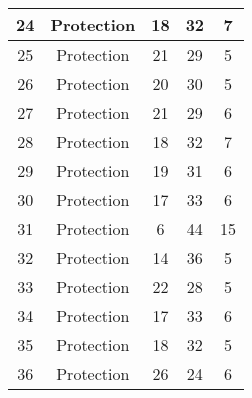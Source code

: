 \documentclass[results.tex]{subfiles}
\begin{document}
\begin{center}
\begin{tabular}{| c || c | c | c | c |}
            \hline
            24                      & Protection                   & 18                     & 32                      & 7                    \\
            \hline
            25                      & Protection                   & 21                     & 29                      & 5                    \\
            \hline
            26                      & Protection                   & 20                     & 30                      & 5                    \\
            \hline
            27                      & Protection                   & 21                     & 29                      & 6                    \\
            \hline
            28                      & Protection                   & 18                     & 32                      & 7                    \\
            \hline
            29                      & Protection                   & 19                     & 31                      & 6                    \\
            \hline
            30                      & Protection                   & 17                     & 33                      & 6                    \\
            \hline
            31                      & Protection                   & 6                      & 44                      & 15                   \\
            \hline
            32                      & Protection                   & 14                     & 36                      & 5                    \\
            \hline
            33                      & Protection                   & 22                     & 28                      & 5                    \\
            \hline
            34                      & Protection                   & 17                     & 33                      & 6                    \\
            \hline
            35                      & Protection                   & 18                     & 32                      & 5                    \\
            \hline
            36                      & Protection                   & 26                     & 24                      & 6                    \\

\end{tabular}
\end{center}
\end{document}
